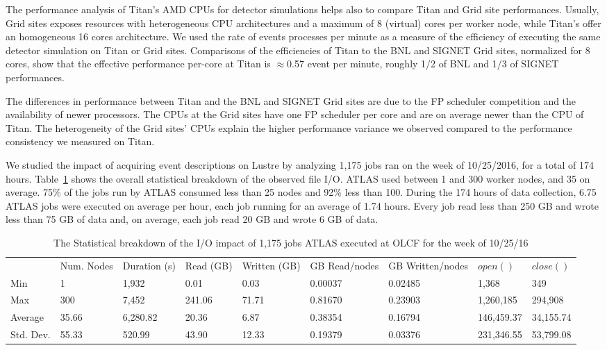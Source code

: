 \documentclass[conference]{IEEEtran}
\begin{document}
The performance analysis of Titan's AMD CPUs for detector simulations helps also
to compare Titan and Grid site performances. Usually, Grid sites exposes
resources with heterogeneous CPU architectures and a maximum of 8 (virtual)
cores per worker node, while Titan's offer an homogeneous 16 cores architecture.
We used the rate of events processes per minute as a measure of the efficiency
of executing the same detector simulation on Titan or Grid sites. Comparisons of
the efficiencies of Titan to the BNL and SIGNET Grid sites, normalized for 8
cores, show that the effective performance per-core at Titan is $\approx$0.57
event per minute, roughly 1/2 of BNL and  1/3 of SIGNET performances.

The differences in performance between Titan and the BNL and SIGNET Grid sites
are due to the FP scheduler competition and the availability of newer
processors. The CPUs at the Grid sites have one FP scheduler per core and are on
average newer than the CPU of Titan. The heterogeneity of the Grid sites' CPUs
explain the higher performance variance we observed compared to the performance
consistency we measured on Titan.

We studied the impact of acquiring event descriptions on Lustre by analyzing
1,175 jobs ran on the week of 10/25/2016, for a total of 174 hours.
Table~\ref{panda-olcf-stats} shows the overall statistical breakdown of the
observed file I/O. ATLAS used between 1 and 300 worker nodes, and 35 on average.
75\% of the jobs run by ATLAS consumed less than 25 nodes and 92\% less than
100. During the 174 hours of data collection, 6.75 ATLAS jobs were executed on
average per hour, each job running for an average of 1.74 hours. Every job read
less than 250 GB and wrote less than 75 GB of data and, on average, each job
read 20 GB and wrote 6 GB of data.

\begin{table}[t]
\centering
\begin{tabular}{lllllllll}
 & Num. Nodes & Duration (s) & Read (GB) & Written (GB) & GB Read/nodes & GB Written/nodes & $open()$ & $close()$ \\
Min & 1 & 1,932 & 0.01 & 0.03 & 0.00037 & 0.02485 & 1,368 & 349 \\
Max & 300 & 7,452 & 241.06 & 71.71 & 0.81670 & 0.23903 & 1,260,185 & 294,908 \\
Average & 35.66 & 6,280.82 & 20.36 & 6.87 & 0.38354 & 0.16794 & 146,459.37 & 34,155.74 \\
Std. Dev. & 55.33 & 520.99 & 43.90 & 12.33 & 0.19379 & 0.03376 & 231,346.55 & 53,799.08
\end{tabular}
\caption{The Statistical breakdown of the I/O impact of 1,175 jobs ATLAS executed at OLCF for the week of 10/25/16}
\label{panda-olcf-stats}
\end{table}
\end{document}
